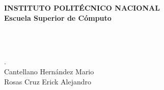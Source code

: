 \begin{center}
	\begin{large}\bf
		INSTITUTO POLIT\'ECNICO NACIONAL\\
		Escuela Superior de Cómputo\\[12pt]
	\end{large}
	\begin{large} \em
		\nameSubject\\
		\nameProfessor\\[12pt]
	\end{large}
	\begin{large}
		\nameDoc.\\[30 pt]
		Cantellano Hern\'andez Mario\\[6 pt]
		Rosas Cruz Erick Alejandro\\[30 pt]
	\end{large}
\end{center}
